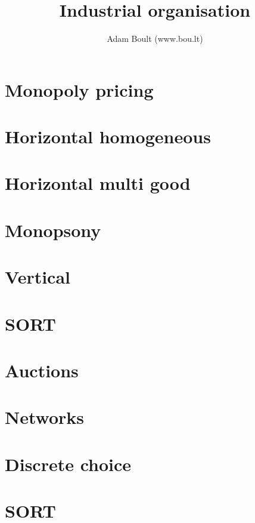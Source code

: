 \documentclass[oneside]{book}
\begin{document}
\author{Adam Boult (www.bou.lt)}
\title{Industrial organisation}
\maketitle

\setcounter{tocdepth}{0}
\tableofcontents



\part{Monopoly pricing}




\part{Horizontal homogeneous}





\part{Horizontal multi good}




\part{Monopsony}

\part{Vertical}


\part{SORT}


\part{Auctions}



\part{Networks}

\part{Discrete choice}




\part{SORT}

\end{document}

